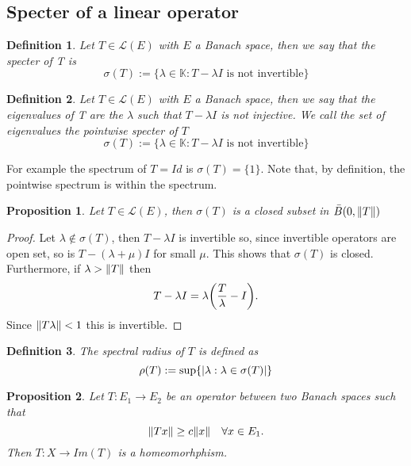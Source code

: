 \documentclass[12pt]{article}
\newtheorem{proposition}{Proposition}
\newtheorem{definition}{Definition}
\begin{document}
\subsection{Specter of a linear operator}
\begin{definition}
	Let $T\in\mathcal{L}(E)$ with $E$ a Banach space, then we say that the \emph{specter of T} is
	\begin{equation*}
		\sigma(T):=\{\lambda\in\mathbb{K}: T-\lambda I \text{ is not invertible}\}
	\end{equation*}
\end{definition}
\begin{definition}
	Let $T\in\mathcal{L}(E)$ with $E$ a Banach space, then we say that the \emph{eigenvalues of T} are the $\lambda$ such that $T-\lambda I$ is not injective. We call the set of eigenvalues the \emph{pointwise specter} of $T$
	\begin{equation*}
		\sigma(T):=\{\lambda\in\mathbb{K}: T-\lambda I \text{ is not invertible}\}
	\end{equation*}
\end{definition}
For example the spectrum of $T=Id$ is $\sigma(T)=\{1\}$. Note that, by definition, the pointwise spectrum is within the spectrum.
\begin{proposition}
	Let $T\in\mathcal{L}(E)$, then $\sigma(T)$ is a closed subset in $\bar{B}(0,\norm{T})$
\end{proposition}
\begin{proof}
	Let $\lambda\notin \sigma(T)$, then $T-\lambda I$ is invertible so, since invertible operators are open set, so is  $T-(\lambda+\mu) I$ for small $\mu$. This shows that $\sigma(T)$ is closed. Furthermore, if $\lambda>\norm{T}$ then
	\begin{equation*}
		T-\lambda I=\lambda \qty(\frac{T}{\lambda}-I).
	\end{equation*}
	Since $\norm{T\lambda}<1$ this is invertible.
\end{proof}
\begin{definition}
	The spectral radius of $T$ is defined as
	\begin{equation*}
		\rho(T):=\sup\{\abs{\lambda:\lambda\in\sigma(T)}\}
	\end{equation*}
\end{definition}
\begin{proposition}
	Let $T:E_1\to E_2$ be an operator between two Banach spaces such that
	\begin{equation*}
		\norm{Tx}\geq c\norm{x}\quad\forall x\in E_1.
	\end{equation*}
	Then $T:X\to Im(T)$ is a homeomorhphism.
\end{proposition}
\end{document}
